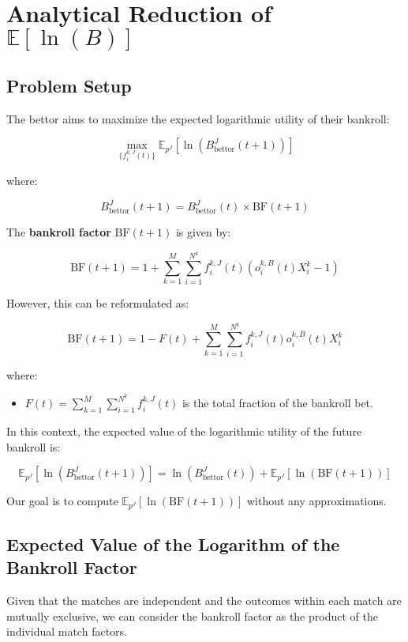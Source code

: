 \chapter{Analytical Reduction of \( \mathbb{E}[\ln(B)] \)}
\label{appendix:analytical_reduction_using_log_expected_utility}

\section{Problem Setup}

The bettor aims to maximize the expected logarithmic utility of their bankroll:

\[
\max_{\{ f_i^{k,J}(t) \}} \mathbb{E}_{p^{J}}\left[ \ln\left( B_{\text{bettor}}^J(t+1) \right) \right]
\]

where:

\[
B_{\text{bettor}}^J(t+1) = B_{\text{bettor}}^J(t) \times \text{BF}(t+1)
\]

The \textbf{bankroll factor} \( \text{BF}(t+1) \) is given by:

\[
\text{BF}(t+1) = 1 + \sum_{k=1}^M \sum_{i=1}^{N^k} f_i^{k,J}(t) \left( o_i^{k,B}(t) X_i^k - 1 \right)
\]

However, this can be reformulated as:

\[
\text{BF}(t+1) = 1 - F(t) + \sum_{k=1}^M \sum_{i=1}^{N^k} f_i^{k,J}(t) o_i^{k,B}(t) X_i^k
\]

where:

\begin{itemize}
    \item \( F(t) = \sum_{k=1}^M \sum_{i=1}^{N^k} f_i^{k,J}(t) \) is the total fraction of the bankroll bet.
\end{itemize}

In this context, the expected value of the logarithmic utility of the future bankroll is:

\[
\mathbb{E}_{p^{J}}\left[ \ln\left( B_{\text{bettor}}^J(t+1) \right) \right] = \ln\left( B_{\text{bettor}}^J(t) \right) + \mathbb{E}_{p^{J}}\left[ \ln\left( \text{BF}(t+1) \right) \right]
\]

Our goal is to compute \( \mathbb{E}_{p^{J}}\left[ \ln\left( \text{BF}(t+1) \right) \right] \) without any approximations.

\section{Expected Value of the Logarithm of the Bankroll Factor}

Given that the matches are independent and the outcomes within each match are mutually exclusive, we can consider the bankroll factor as the product of the individual match factors.

